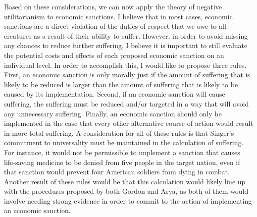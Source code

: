 \documentclass[12pt]{article}
\begin{document}
Based on these considerations, we can now apply the theory of negative utilitarianism to economic sanctions.
I believe that in most cases, economic sanctions are a direct violation of the duties of respect that we owe to all creatures as a result of their ability to suffer.
However, in order to avoid missing any chances to reduce further suffering, I believe it is important to still evaluate the potential costs and effects of each proposed economic sanction on an individual level.
In order to accomplish this, I would like to propose three rules.
First, an economic sanction is only morally just if the amount of suffering that is likely to be reduced is larger than the amount of suffering that is likely to be caused by its implementation.
Second, if an economic sanction will cause suffering, the suffering must be reduced and/or targeted in a way that will avoid any unnecessary suffering.
Finally, an economic sanction should only be implemented in the case that every other alternative course of action would result in more total suffering.
A consideration for all of these rules is that Singer's commitment to universality must be maintained in the calculation of suffering.
For instance, it would not be permissible to implement a sanction that causes life-saving medicine to be denied from five people in the target nation, even if that sanction would prevent four American soldiers from dying in combat.
Another result of these rules would be that this calculation would likely line up with the procedures proposed by both Gordon and Arya, as both of them would involve needing strong evidence in order to commit to the action of implementing an economic sanction.
\end{document}
